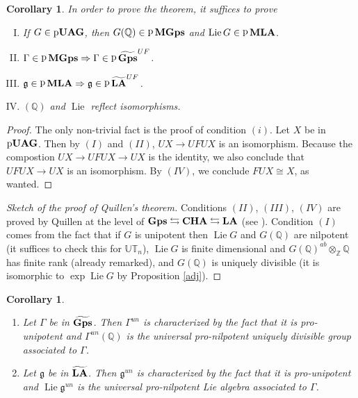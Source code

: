 \documentclass{amsart}
\newtheorem{cor}[thm]{Corollary}
\theoremstyle{definition}
\theoremstyle{remark}
\theoremstyle{remark}
\newcommand{\Q}{\mathbb{Q}}
\newcommand{\Z}{\mathbb{Z}}
\newcommand{\ra}{\rightarrow}
\newcommand{\mfg}{\mathfrak{g}}
\DeclareMathOperator{\Lie}{Lie}
\DeclareMathOperator{\pro}{{p}}
\DeclareMathOperator{\CHA}{\bf{CHA}}
\DeclareMathOperator{\Gps}{\bf{Gps}}
\DeclareMathOperator{\LA}{\bf{LA}}
\DeclareMathOperator{\MGps}{\bf{MGps}}
\DeclareMathOperator{\MLA}{\bf{MLA}}
\DeclareMathOperator{\pUAG}{p\bf{UAG}}
\begin{document}
\begin{cor}
In order to prove the theorem, it suffices to prove
\begin{enumerate}[(I)]
	\item If $G\in\pUAG$, then $G(\Q)\in\pro\MGps$ and $\Lie G\in\pro\MLA$.
	\item $\Gamma\in\pro\MGps\Rightarrow\Gamma\in \pro\widetilde{\Gps}^{UF}$.
	\item $\mfg\in\pro\MLA\Rightarrow\mfg\in \pro\widetilde{\LA}^{UF}$.
	\item $(\Q)$ and $\Lie$ reflect isomorphisms.
\end{enumerate}
\end{cor}

\begin{proof}
The only non-trivial fact is the proof of condition $(i)$. Let $X$ be in $\pUAG$. Then by $(I)$ and $(II)$, $UX\ra UFUX$ is an isomorphism. Because the compostion $UX\ra UFUX\ra UX$ is the identity, we also conclude that $UFUX\ra UX$ is an isomorphism. By $(IV)$, we conclude $FUX\cong X$, as wanted.
\end{proof}

\begin{proof}[Sketch of the proof of Quillen's theorem]
Conditions $(II)$, $(III)$, $(IV)$ are proved by Quillen at the level of $\Gps\leftrightarrows\CHA\leftrightarrows\LA$ (see \cite[Theorem A.3.3]{quillen-r}). Condition $(I)$ comes from the fact that if $G$ is unipotent then $\Lie G$ and $G(\Q)$ are nilpotent (it suffices to check this for $\mathbb{UT}_n$), $\Lie G$ is finite dimensional and $G(\Q)^{ab}\otimes_\Z\Q$ has finite rank (already remarked), and $G(\Q)$ is uniquely divisible (it is isomorphic to $\exp\Lie G$ by Proposition \ref{adj}).
\end{proof}

\begin{cor}\label{univ}
\begin{enumerate}
	\item Let $\Gamma$ be in $\widetilde{\Gps}$. Then $\Gamma^{un}$ is characterized by the fact that it is pro-unipotent and $\Gamma^{un}(\Q)$ is the universal pro-nilpotent uniquely divisible group associated to $\Gamma$.
	\item Let $\mfg$ be in $\widetilde{\LA}$. Then $\mfg^{un}$ is characterized by the fact that it is pro-unipotent and $\Lie\mfg^{un}$ is the universal pro-nilpotent Lie algebra associated to $\Gamma$.
\end{enumerate}
\end{cor}
\end{document}
